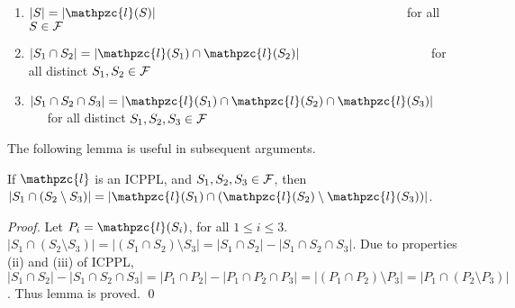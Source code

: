 \documentclass[11pt,
               envcountsect,
               envcountsame]
               {../lib/llncs2e/llncs}
\def\cF{{\cal F}}
\def\cl{\mathpzc{l}}
\def\icpplpr{Property}
\def\xnoindent{\noindent} %
\def\topshrink{0mm} %
\begin{document}

\begin{enumerate}[{(\icpplpr\ }i) \ \ \ ]
\item \label{pr:i} $|S| = |\cl(S)|$ \ \ \ \ \ \ \ \ \ \ \ \ \ \ \ \ \ \ \ \ \ \ \ \
  \ \ \ \ \ \ \ \ \ \ \ \ \ \ \ for all $S \in \cF$
\item \label{pr:ii}$|S_1 \cap S_2| = |\cl(S_1) \cap \cl(S_2)|$ \ \ \ \ \ \ \ \ \ \
  \ \ \ \ \ \ \ \ \ \ for all distinct
  $S_1, S_2 \in \cF$
\item \label{pr:iii}$|S_1 \cap S_2 \cap S_3| = |\cl(S_1) \cap \cl(S_2) \cap
  \cl(S_3)|$ \ \ \ for all distinct $S_1, S_2, S_3 \in
  \cF$
\end{enumerate}


\noindent
The following lemma is useful in subsequent arguments. 
\begin{lemma}
  \label{lem:setminuscard}
  If $\cl$ is an ICPPL, and $S_1, S_2, S_3 \in \cF$, then $|S_1 \cap
  (S_2 \setminus S_3)| = |\cl(S_1) \cap (\cl(S_2) \setminus
  \cl(S_3))|$.
\end{lemma}
\begin{proof}%
  Let $P_i = \cl(S_i)$, for all $1 \le i \le  3$.
  $|S_1 \cap (S_2 \setminus S_3)| = |(S_1 \cap S_2) \setminus S_3| =
  |S_1 \cap S_2| - |S_1 \cap S_2 \cap S_3|$. Due to properties (ii)
  and (iii) of ICPPL, $|S_1 \cap S_2| - |S_1 \cap S_2 \cap S_3| = |P_1
  \cap P_2| - |P_1 \cap P_2 \cap P_3| = |(P_1 \cap P_2) \setminus P_3|
  = |P_1 \cap (P_2 \setminus P_3)|$. Thus lemma is proved. \qed
\end{proof}

\def \xnoindent  {}
\end{document}

